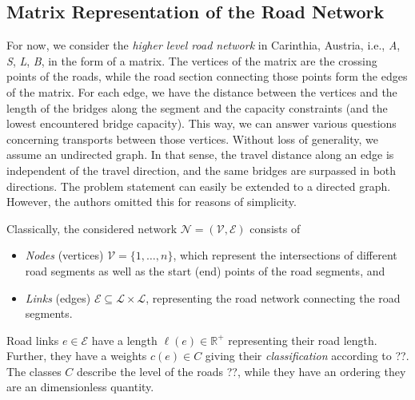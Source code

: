%
\subsection{Matrix Representation of the Road Network}

For now, we consider the \textit{higher level road network} in Carinthia, Austria,
i.e., \textit{A}, \textit{S}, \textit{L}, \textit{B}, in the  form of a matrix.
The vertices of the matrix are the crossing points of the roads, while
the road section connecting those points form the edges of the matrix.
For each edge, we have the distance between the vertices and the length of the bridges along the segment
and the capacity constraints (and the lowest encountered bridge capacity).
This way, we can answer various questions concerning transports between those vertices.
Without loss of generality, we assume an undirected graph.
In that sense, the travel distance along an edge is independent of
the travel direction, and  the same bridges are surpassed in both directions.
The problem statement can
easily be extended to a directed graph. However, the authors omitted this for reasons of simplicity.

Classically,  the considered network $\mathcal{N}=(\mathcal{V},\mathcal{E})$ consists of
\begin{itemize}
  \item \emph{Nodes} (vertices) $\mathcal{V}=\{1,\ldots, n\}$, which represent the intersections of different road segments as
  well as the start (end) points of the road segments, and

  \item \emph{Links} (edges) $\mathcal{E} \subseteq \mathcal{L} \times \mathcal{L}$,
  representing the road network connecting the road segments.
\end{itemize}

Road links $e \in \mathcal{E}$ have a length $\ell(e)\in \mathbb{R}^{+}$ representing their road length.
Further, they have a weights $c(e) \in C$ giving their \emph{classification} according to {\color{red} ??}.
The classes $C$ describe the level of the roads {\color{red} ??},
while they have an ordering they are an dimensionless quantity.

